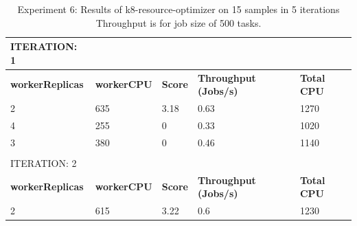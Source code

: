 \begin{table}[H]
\centering
\caption {Experiment 6: Results of k8-resource-optimizer on 15 samples in 5 iterations  Throughput is for job size of 500  tasks.}
\label{tbl:exp6}
\begin{tabular}{lllll}
ITERATION: 1                                  &                                         &                                     &                                                  &                                         \\ \hline
\multicolumn{1}{|l|}{\textbf{workerReplicas}} & \multicolumn{1}{l|}{\textbf{workerCPU}} & \multicolumn{1}{l|}{\textbf{Score}} & \multicolumn{1}{l|}{\textbf{Throughput (Jobs/s)}} & \multicolumn{1}{l|}{\textbf{Total CPU}} \\ \hline
\multicolumn{1}{|l|}{2}                       & \multicolumn{1}{l|}{635}                & \multicolumn{1}{l|}{3.18}           & \multicolumn{1}{l|}{0.63}                        & \multicolumn{1}{l|}{1270}               \\ \hline
\multicolumn{1}{|l|}{4}                       & \multicolumn{1}{l|}{255}                & \multicolumn{1}{l|}{0}              & \multicolumn{1}{l|}{0.33}                        & \multicolumn{1}{l|}{1020}               \\ \hline
\multicolumn{1}{|l|}{3}                       & \multicolumn{1}{l|}{380}                & \multicolumn{1}{l|}{0}              & \multicolumn{1}{l|}{0.46}                        & \multicolumn{1}{l|}{1140}               \\ \hline
                                              &                                         &                                     &                                                  &                                         \\
ITERATION: 2                                  &                                         &                                     &                                                  &                                         \\ \hline
\multicolumn{1}{|l|}{\textbf{workerReplicas}} & \multicolumn{1}{l|}{\textbf{workerCPU}} & \multicolumn{1}{l|}{\textbf{Score}} & \multicolumn{1}{l|}{\textbf{Throughput (Jobs/s)}} & \multicolumn{1}{l|}{\textbf{Total CPU}} \\ \hline
\multicolumn{1}{|l|}{2}                       & \multicolumn{1}{l|}{615}                & \multicolumn{1}{l|}{3.22}           & \multicolumn{1}{l|}{0.6}                         & \multicolumn{1}{l|}{1230}               \\ \hline

\end{tabular}
\end{table}
